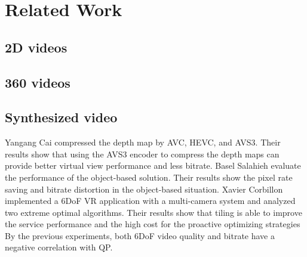 \section{Related Work} \label{sec:related}

\subsection{2D videos}

\subsection{360 videos}

\subsection{Synthesized video}
Yangang Cai \cite{CWQP+21} compressed the depth map by AVC, HEVC, and AVS3. Their results show that using the AVS3 encoder to compress the depth maps can provide better virtual view performance and less bitrate.
Basel Salahieh \cite{SCB21} evaluate the performance of the object-based solution. Their results show the pixel rate saving and bitrate distortion in the object-based situation.
Xavier Corbillon \cite{CDSF18} implemented a 6DoF VR application with a multi-camera system and analyzed two extreme optimal algorithms. Their results show that tiling is able to improve the service performance and the high cost for the proactive optimizing strategies
By the previous experiments, both 6DoF video quality and bitrate have a negative correlation with QP.
